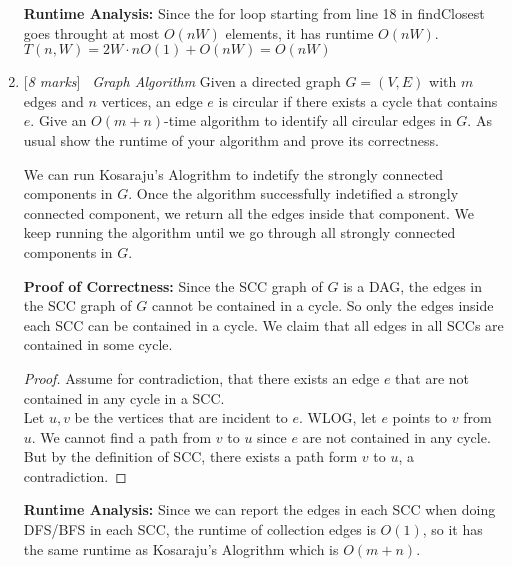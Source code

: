 \documentclass[11pt]{article}
\newcommand{\Q}[1]{\medskip\item {[{\em #1 marks\/}]}\ }
\begin{document}
\begin{enumerate}
\textbf{Runtime Analysis:} Since the for loop starting from line 18 in findClosest goes throught at most 
$O(nW)$ elements, it has runtime $O(nW)$.
$T(n, W) = 2W \cdot n O(1) + O(nW) = O(nW)$

\newpage
\Q{8} {\em Graph Algorithm } Given a directed graph $G = (V, E)$ with $m$ edges and $n$ vertices, an edge $e$ is circular if there exists a cycle that contains $e$. Give an $O(m + n)$-time algorithm to identify all circular edges in $G$.  As usual show the runtime of your algorithm and prove its correctness.

We can run Kosaraju's Alogrithm to indetify the strongly connected components in $G$. Once the algorithm 
successfully indetified a strongly connected component, we return all the edges inside that component. We keep 
running the algorithm until we go through all strongly connected components in $G$.

\textbf{Proof of Correctness:} Since the SCC graph of $G$ is a DAG, the edges in the SCC graph of $G$ cannot 
be contained in a cycle. So only the edges inside each SCC can be contained in a cycle. We claim that all 
edges in all SCCs are contained in some cycle.
\begin{proof}
    Assume for contradiction, that there exists an edge $e$ that are not contained in any cycle in a SCC.\\
    Let $u, v$ be the vertices that are incident to $e$. WLOG, let $e$ points to $v$ from $u$. We cannot find 
    a path from $v$ to $u$ since $e$ are not contained in any cycle. But by the definition of SCC, there exists 
    a path form $v$ to $u$, a contradiction.
\end{proof}

\textbf{Runtime Analysis:} Since we can report the edges in each SCC when doing DFS/BFS in each SCC, the runtime 
of collection edges is $O(1)$, so it has the same runtime as Kosaraju's Alogrithm which is $O(m + n)$.

\end{enumerate}
\end{document}
